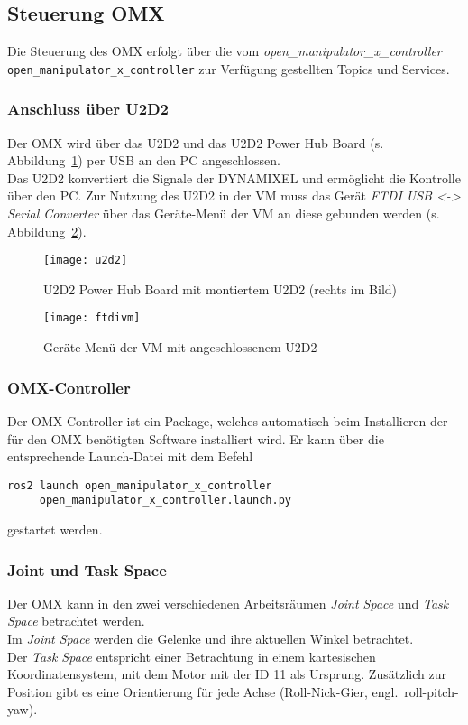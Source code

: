 \subsection{Steuerung OMX}
Die Steuerung des OMX erfolgt über die vom \emph{open\_manipulator\_x\_controller}\\ \verb|open_manipulator_x_controller| zur Verfügung gestellten Topics und Services.

\subsubsection{Anschluss über U2D2}{\label{u2d2}}
Der OMX wird über das U2D2 und das U2D2 Power Hub Board (s. Abbildung~\ref{fig:u2d2}) per USB an den PC angeschlossen.\\
Das U2D2 konvertiert die Signale der DYNAMIXEL und ermöglicht die Kontrolle über den PC. Zur Nutzung des U2D2 in der \ac{VM} muss das Gerät \emph{FTDI USB <-> Serial Converter} über das Geräte-Menü der \ac{VM} an diese gebunden werden (s. Abbildung~\ref{fig:ftdivm}).
\begin{figure}[ht!]
\centering
\texttt{[image: u2d2]}
\caption{U2D2 Power Hub Board mit montiertem U2D2 (rechts im Bild)}
\label{fig:u2d2}
\end{figure}
\begin{figure}[ht!]
\centering
\texttt{[image: ftdivm]}
\caption{Geräte-Menü der \ac{VM} mit angeschlossenem U2D2}
\label{fig:ftdivm}
\end{figure}


\subsubsection{OMX-Controller}
Der OMX-Controller ist ein Package, welches automatisch beim Installieren der für den OMX benötigten Software installiert wird.
Er kann über die entsprechende Launch-Datei mit dem Befehl
\begin{verbatim}
ros2 launch open_manipulator_x_controller 
     open_manipulator_x_controller.launch.py
\end{verbatim}
gestartet werden.
\subsubsection{Joint und Task Space}
Der OMX kann in den zwei verschiedenen Arbeitsräumen \emph{Joint Space} und \emph{Task Space} betrachtet werden.\\
Im \emph{Joint Space} werden die Gelenke und ihre aktuellen Winkel betrachtet.\\
Der \emph{Task Space} entspricht einer Betrachtung in einem kartesischen Koordinatensystem, mit dem Motor mit der ID 11 als Ursprung.
Zusätzlich zur Position gibt es eine Orientierung für jede Achse (Roll-Nick-Gier, engl.\ roll-pitch-yaw).
